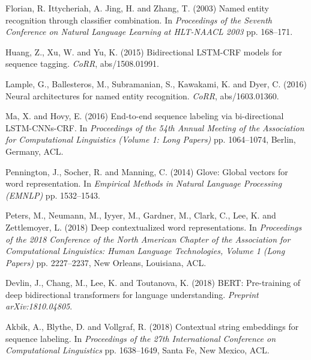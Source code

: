 \documentclass{nle}
\begin{document}
\begin{thebibliography}{}
Florian, R. Ittycheriah, A. Jing, H. and Zhang, T. (2003)
Named entity recognition through classifier combination.
In {\it Proceedings of the Seventh Conference on Natural Language Learning at HLT-NAACL 2003}
pp. 168--171.

Huang, Z., Xu, W. and Yu, K. (2015)
Bidirectional {LSTM-CRF} models for sequence tagging.
{\it CoRR}, abs/1508.01991.

Lample, G., Ballesteros, M., Subramanian, S., Kawakami, K. and Dyer, C. (2016)
Neural architectures for named entity recognition.
{\it CoRR}, abs/1603.01360.

Ma, X. and Hovy, E. (2016)
End-to-end sequence labeling via bi-directional {LSTM}-{CNN}s-{CRF}.
In {\it Proceedings of the 54th Annual Meeting of the Association for Computational Linguistics (Volume 1: Long Papers)}
pp. 1064--1074, Berlin, Germany, ACL.

Pennington, J., Socher, R. and Manning, C. (2014)
Glove: Global vectors for word representation.
In {\it Empirical Methods in Natural Language Processing (EMNLP)}
pp. 1532--1543.

Peters, M., Neumann, M., Iyyer, M., Gardner, M., Clark, C., Lee, K. and Zettlemoyer, L. (2018)
Deep contextualized word representations.
In {\it Proceedings of the 2018 Conference of the North American Chapter of the Association for Computational Linguistics: Human Language Technologies, Volume 1 (Long Papers)}
pp. 2227--2237, New Orleans, Louisiana, ACL.

Devlin, J., Chang, M., Lee, K. and Toutanova, K. (2018)
{BERT}: Pre-training of deep bidirectional transformers for language understanding.
{\it Preprint arXiv:1810.04805}.

Akbik, A., Blythe, D. and Vollgraf, R. (2018)
Contextual string embeddings for sequence labeling.
In {\it Proceedings of the 27th International Conference on Computational Linguistics}
pp. 1638--1649, Santa Fe, New Mexico, ACL.


\end{thebibliography}
\end{document}
